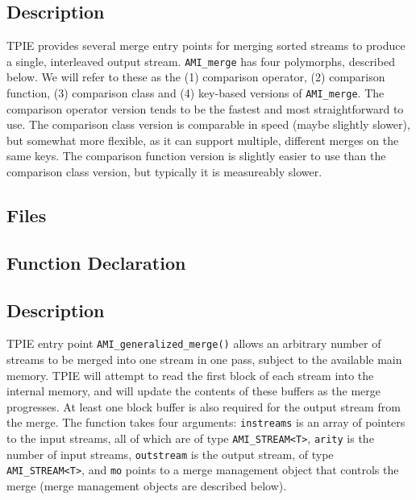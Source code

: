 \subsection{Description}

TPIE provides several merge entry points for merging sorted streams to
produce a single, interleaved output stream. \lstinline|AMI_merge| has
four polymorphs, described below. We will refer to these as the (1)
comparison operator, (2) comparison function, (3) comparison class and (4) key-based
versions of \lstinline|AMI_merge|. 
 The comparison operator version tends to
be the fastest and most straightforward to use. The
comparison class version is comparable in speed (maybe
slightly slower), but somewhat more flexible, as it can support
multiple, different merges on the same keys. The comparison
function version is slightly easier to use than the
comparison class version, but typically it is measureably slower.




\subsection{Files}
  \btabb
     {}
  \etabb

\subsection{Function Declaration}
  \btabb
     {}
  \etabb

\subsection{Description}
TPIE entry point \lstinline|AMI_generalized_merge()| allows an
arbitrary number of streams to be merged into one stream in one pass,
subject to the available main memory.  TPIE will attempt to read the
first block of each stream into the internal memory, and will update
the contents of these buffers as the merge progresses. At least one
block buffer is also required for the output stream from the merge.
The function takes four arguments:
\lstinline|instreams| is an array of pointers to the input streams, all of
  which are of type \lstinline|AMI_STREAM<T>|,
\lstinline|arity| is the number of input streams,
\lstinline|outstream| is the output stream, of type \lstinline|AMI_STREAM<T>|, and
\lstinline|mo| points to a merge management object that controls the
  merge (merge management objects are described below).

